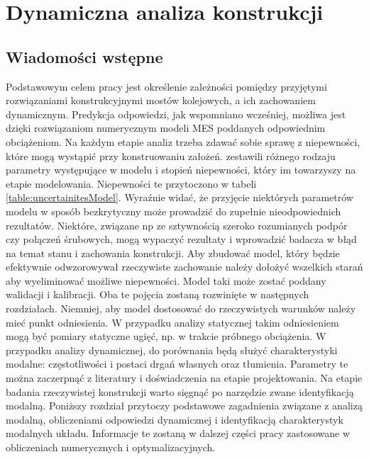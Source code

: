 \chapter{Dynamiczna analiza konstrukcji}

\section{Wiadomości wstępne} \label{section: modalAnalysisIntro}
Podstawowym celem pracy jest określenie zależności pomiędzy przyjętymi rozwiązaniami konstrukcyjnymi mostów kolejowych, a ich zachowaniem dynamicznym. Predykcja odpowiedzi, jak wspomniano wcześniej, możliwa jest dzięki rozwiązaniom numerycznym modeli MES poddanych odpowiednim obciążeniom. Na każdym etapie analiz trzeba zdawać sobie sprawę z niepewności, które mogą wystąpić przy konstruowaniu założeń. \cite{Brincker2015} zestawili różnego rodzaju parametry występujące w modelu i stopień niepewności, który im towarzyszy na etapie modelowania. Niepewności te przytoczono w tabeli \ref{table:uncertainitesModel}. Wyraźnie widać, że przyjęcie niektórych parametrów modelu w sposób bezkrytyczny może prowadzić do zupełnie nieodpowiednich rezultatów. Niektóre, związane np ze sztywnością szeroko rozumianych podpór czy połączeń śrubowych, mogą wypaczyć rezultaty i wprowadzić badacza w błąd na temat stanu i zachowania konstrukcji. Aby zbudować model, który będzie efektywnie odwzorowywał rzeczywiste zachowanie należy dołożyć wszelkich starań aby wyeliminować możliwe niepewności. Model taki może zostać poddany walidacji i kalibracji. Oba te pojęcia zostaną rozwinięte w następnych rozdziałach. Niemniej, aby model dostosować do rzeczywistych warunków należy mieć punkt odniesienia. W przypadku analizy statycznej takim odniesieniem mogą być pomiary statyczne ugięć, np. w trakcie próbnego obciążenia. W przypadku analizy dynamicznej, do porównania będą służyć charakterystyki modalne: częstotliwości i postaci drgań własnych oraz tłumienia. Parametry te można zaczerpnąć z literatury i doświadczenia na etapie projektowania. Na etapie badania rzeczywistej konstrukcji warto sięgnąć po narzędzie zwane identyfikacją modalną. Poniższy rozdział przytoczy podstawowe zagadnienia związane z analizą modalną, obliczeniami odpowiedzi dynamicznej i identyfikacją charakterystyk modalnych układu. Informacje te zostaną w dalszej części pracy zastosowane w obliczeniach numerycznych i optymalizacyjnych.



